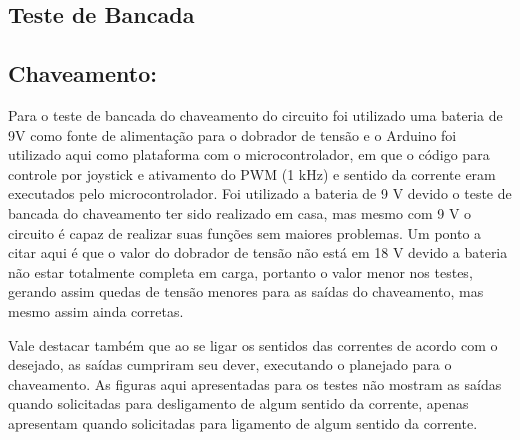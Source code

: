 \begin{anexosenv}

  \partanexos

  \chapter{Teste de Bancada}

      \section{Chaveamento:}

      Para o teste de bancada do chaveamento do circuito foi utilizado uma bateria de 9V como fonte de alimentação para o dobrador de tensão e o Arduino foi utilizado aqui como plataforma com o microcontrolador, em que o código para controle por joystick e ativamento do PWM (1 kHz) e sentido da corrente eram executados pelo microcontrolador. Foi utilizado a bateria de 9 V devido o teste de bancada do chaveamento ter sido realizado em casa, mas mesmo com 9 V o circuito é capaz de realizar suas funções sem maiores problemas. Um ponto a citar aqui é que o valor do dobrador de tensão não está em 18 V devido a bateria não estar totalmente completa em carga, portanto o valor menor nos testes, gerando assim quedas de tensão menores para as saídas do chaveamento, mas mesmo assim ainda corretas.

      Vale destacar também que ao se ligar os sentidos das correntes de acordo com o desejado, as saídas cumpriram seu dever, executando o planejado para o chaveamento. As figuras aqui apresentadas para os testes não mostram as saídas  quando solicitadas para desligamento de algum sentido da corrente, apenas apresentam quando solicitadas para ligamento de algum sentido da corrente.


\end{anexosenv}
